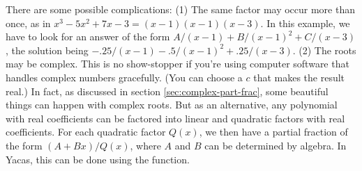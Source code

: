 There are some possible complications:
(1) The same factor may occur more than once, as in
$x^3-5x^2+7x-3=(x-1)(x-1)(x-3)$. In this example, we have to look for an answer of the form
$A/(x-1)+B/(x-1)^2+C/(x-3)$, the solution being
$-.25/(x-1)-.5/(x-1)^2+.25/(x-3)$.
(2) The roots may be complex. 
This is no show-stopper
if you're using computer software that handles complex numbers gracefully. (You can choose a $c$
that makes the result real.) 
In fact, as discussed in section \ref{sec:complex-part-frac}, some beautiful things can happen
with complex roots. But as an alternative,
any polynomial with real coefficients can be factored into linear
and quadratic factors with real coefficients. For each quadratic factor $Q(x)$, we then have a
partial fraction of the form $(A+Bx)/Q(x)$, where $A$ and $B$ can be determined by algebra.
In Yacas, this can be done using the \verb@Apart@ function.

